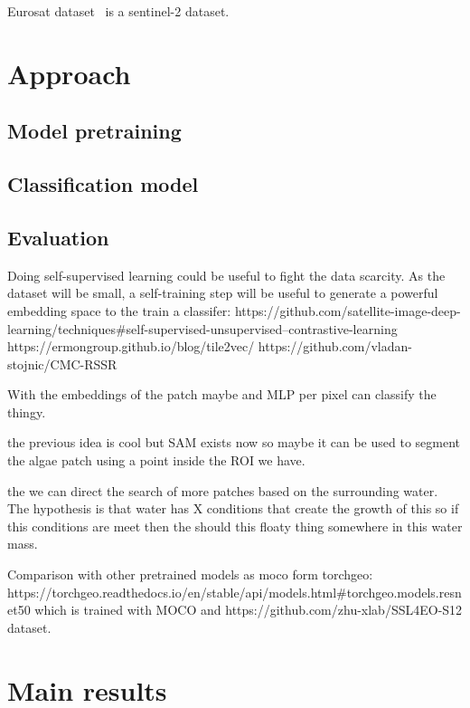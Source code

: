 \documentclass[conference]{IEEEtran}
\begin{document}
    Eurosat dataset~\cite{helber2019eurosat} is a sentinel-2 dataset.


    \section{Approach}

    \subsection{Model pretraining}

    \subsection{Classification model}

    \subsection{Evaluation}



    Doing self-supervised learning could be useful to fight the data scarcity.
    As the dataset will be small, a self-training step will be useful to generate
    a powerful embedding space to the train a classifer:
    https://github.com/satellite-image-deep-learning/techniques#self-supervised-unsupervised--contrastive-learning
    https://ermongroup.github.io/blog/tile2vec/
    https://github.com/vladan-stojnic/CMC-RSSR

    With the embeddings of the patch maybe and MLP per pixel can classify the thingy.


    the previous idea is cool but SAM exists now so maybe it can be used to segment the algae patch
    using a point inside the ROI we have.

    the we can direct the search of more patches based on the surrounding water.
    The hypothesis is that water has X conditions that create the growth of this so if this conditions
    are meet then the should this floaty thing somewhere in this water mass.


    Comparison with other pretrained models as moco form torchgeo:
    https://torchgeo.readthedocs.io/en/stable/api/models.html#torchgeo.models.resnet50 which is trained with MOCO and https://github.com/zhu-xlab/SSL4EO-S12 dataset.


    \section{Main results}
\end{document}
